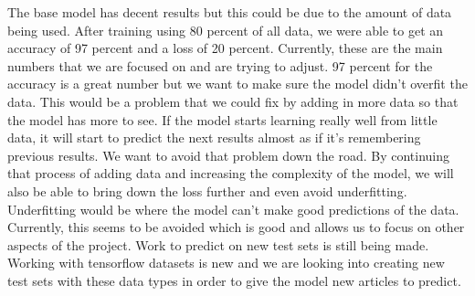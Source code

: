 The base model has decent results but this could be due to the amount of data being used. After training using 80 percent of all data, we were able to get an accuracy of 97 percent and a loss of 20 percent. Currently, these are the main numbers that we are focused on and are trying to adjust. 97 percent for the accuracy is a great number but we want to make sure the model didn't overfit the data. This would be a problem that we could fix by adding in more data so that the model has more to see. If the model starts learning really well from little data, it will start to predict the next results almost as if it's remembering previous results. We want to avoid that problem down the road. By continuing that process of adding data and increasing the complexity of the model, we will also be able to bring down the loss further and even avoid underfitting. Underfitting would be where the model can't make good predictions of the data. Currently, this seems to be avoided which is good and allows us to focus on other aspects of the project. Work to predict on new test sets is still being made. Working with tensorflow datasets is new and we are looking into creating new test sets with these data types in order to give the model new articles to predict.